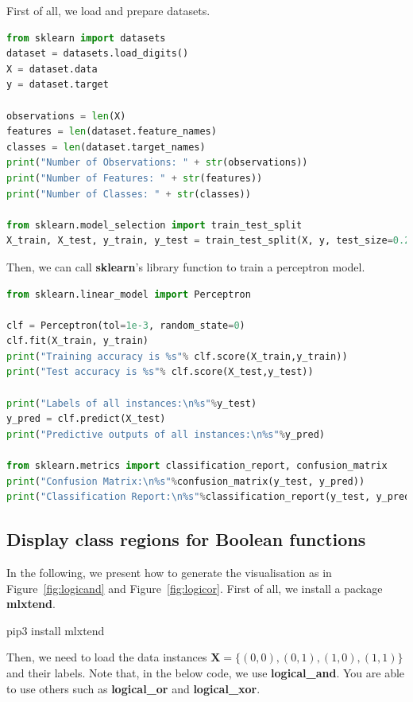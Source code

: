 First of all, we load and prepare datasets. 

\begin{lstlisting}[language=Python]
from sklearn import datasets
dataset = datasets.load_digits()
X = dataset.data
y = dataset.target

observations = len(X)
features = len(dataset.feature_names)
classes = len(dataset.target_names)
print("Number of Observations: " + str(observations))
print("Number of Features: " + str(features))
print("Number of Classes: " + str(classes))

from sklearn.model_selection import train_test_split
X_train, X_test, y_train, y_test = train_test_split(X, y, test_size=0.20)
\end{lstlisting}

Then, we can call \textbf{sklearn}'s library function to train a perceptron model. 

\begin{lstlisting}[language=Python]
from sklearn.linear_model import Perceptron

clf = Perceptron(tol=1e-3, random_state=0)
clf.fit(X_train, y_train)
print("Training accuracy is %s"% clf.score(X_train,y_train))
print("Test accuracy is %s"% clf.score(X_test,y_test))

print("Labels of all instances:\n%s"%y_test)
y_pred = clf.predict(X_test)
print("Predictive outputs of all instances:\n%s"%y_pred)

from sklearn.metrics import classification_report, confusion_matrix
print("Confusion Matrix:\n%s"%confusion_matrix(y_test, y_pred))
print("Classification Report:\n%s"%classification_report(y_test, y_pred))
\end{lstlisting}


\subsection*{Display class regions for Boolean functions}

In the following, we present how to generate the visualisation as in Figure~\ref{fig:logicand} and Figure~\ref{fig:logicor}.
%
First of all, we install a package \textbf{mlxtend}. 

\begin{cmds}
pip3 install mlxtend
\end{cmds}

Then, we need to load the data instances $\textbf{X}=\{(0,0),(0,1),(1,0),(1,1)\}$ and their labels. Note that, in the below code, we use \textbf{logical\_and}. You are able to use others such as \textbf{logical\_or} and \textbf{logical\_xor}. 

